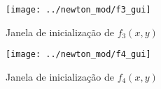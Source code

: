 \begin{figure}[H]
	\begin{center}
		\texttt{[image: ../newton\_mod/f3\_gui]}   
		\caption{Janela de inicialização de $ f_3(x,y) $}
		\label{fig:newton_mod_f3_gui}
	\end{center}
\end{figure}

\begin{figure}[H]
	\begin{center}
		\texttt{[image: ../newton\_mod/f4\_gui]}   
		\caption{Janela de inicialização de $ f_4(x,y) $}
		\label{fig:newton_mod_f4_gui}
	\end{center}
\end{figure}
